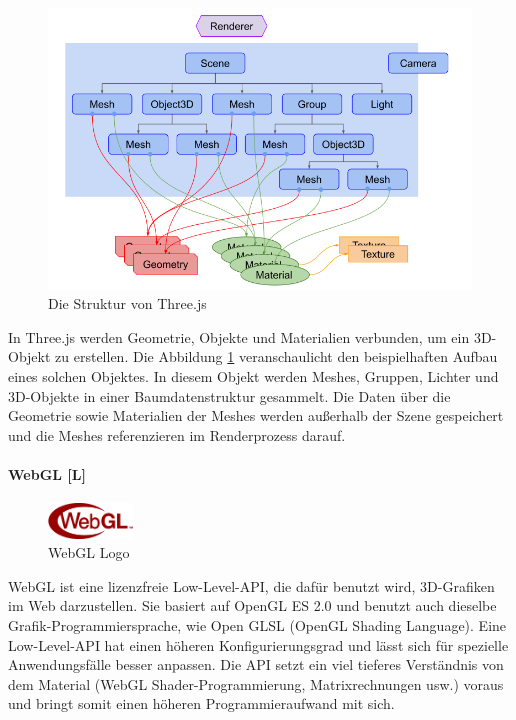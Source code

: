 \begin{figure} [h t]
  \centering
  \includegraphics[scale=0.5]{pics/threejs-structure.png}
  \caption{Die Struktur von Three.js \cite{ThreeJsFund}}
  \label{fig:tech:front:threejsstructure}
\end{figure}

In Three.js werden Geometrie, Objekte und Materialien verbunden, um ein 3D-Objekt zu erstellen. 
Die Abbildung \ref{fig:tech:front:threejsstructure} veranschaulicht den beispielhaften Aufbau eines solchen Objektes. In diesem Objekt werden Meshes, Gruppen, Lichter und 3D-Objekte in einer Baumdatenstruktur gesammelt. Die Daten über die Geometrie sowie Materialien der Meshes werden außerhalb der Szene gespeichert und die Meshes referenzieren im Renderprozess darauf. \cite{ThreeJsFund}

\paragraph{WebGL [L]}
\label{ch::webgl}
\label{ch::ThreeJsDependency}
\begin{figure}
    \begin{center}
      \includegraphics[width=0.2\textwidth]{pics/WebGL_Logo.png}
     \caption{WebGL Logo}
    \end{center}
\end{figure}
WebGL ist eine lizenzfreie Low-Level-API, die dafür benutzt wird, 3D-Grafiken im Web darzustellen. Sie basiert auf OpenGL ES 2.0 und benutzt auch dieselbe Grafik-Programmiersprache, wie Open GLSL (OpenGL Shading Language). Eine Low-Level-API hat einen höheren Konfigurierungsgrad und lässt sich für spezielle Anwendungsfälle besser anpassen. Die API setzt ein viel tieferes Verständnis von dem Material (WebGL Shader-Programmierung, Matrixrechnungen usw.) voraus und bringt somit einen höheren Programmieraufwand mit sich. \cite{WebglGettingStarted, HighlowAPI}

